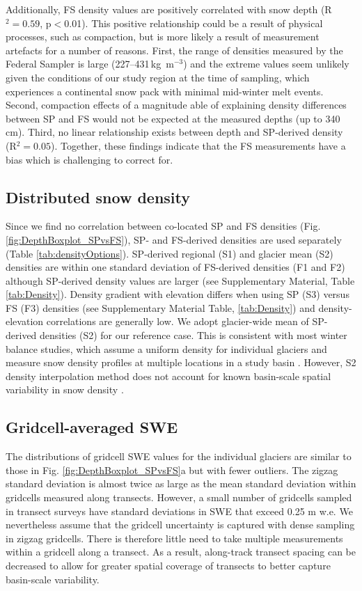 \documentclass[twocolumn, letterpaper]{igs}
\begin{document}
Additionally, FS density values are positively correlated with snow depth (R$^2= 0.59$, p$<$0.01). This positive relationship could be a result of physical processes, such as compaction, but is more likely a result of measurement artefacts for a number of reasons. First, the range of densities measured by the Federal Sampler is large (227--431\,kg\, m$^{-3}$) and the extreme values seem unlikely given the conditions of our study region at the time of sampling, which experiences a continental snow pack with minimal mid-winter melt events. Second, compaction effects of a magnitude able of explaining density differences between SP and FS would not be expected at the measured depths (up to 340\,cm). Third, no linear relationship exists between depth and SP-derived density (R$^2 = 0.05$). Together, these findings indicate that the FS measurements have a bias which is challenging to correct for.

\subsection{Distributed snow density}

Since we find no correlation between co-located SP and FS densities (Fig. \ref{fig:DepthBoxplot_SPvsFS}), SP- and FS-derived densities are used separately (Table \ref{tab:densityOptions}). SP-derived regional (S1) and glacier mean (S2) densities are within one standard deviation of FS-derived densities (F1 and F2) although SP-derived density values are larger (see Supplementary Material, Table \ref{tab:Density}). Density gradient with elevation differs when using SP (S3) versus FS (F3) densities (see Supplementary Material Table, \ref{tab:Density}) and density-elevation correlations are generally low. 
We adopt glacier-wide mean of SP-derived densities (S2) for our reference case. This is consistent with most winter balance studies, which assume a uniform density for individual glaciers and measure snow density profiles at multiple locations in a study basin \citep[e.g.][]{Elder1991,McGrath2015,Cullen2017}. However, S2 density interpolation method does not account for known basin-scale spatial variability in snow density \citep[e.g.][]{Wetlaufer2016}. 

\subsection{Gridcell-averaged SWE}

The distributions of gridcell SWE values for the individual glaciers are similar to those in Fig. \ref{fig:DepthBoxplot_SPvsFS}a but with fewer outliers. The zigzag standard deviation is almost twice as large as the mean standard deviation within gridcells measured along transects. However, a small number of gridcells sampled in transect surveys have standard deviations in SWE that exceed 0.25 m w.e. We nevertheless assume that the gridcell uncertainty is captured with dense sampling in zigzag gridcells. There is therefore little need to take multiple measurements within a gridcell along a transect. As a result, along-track transect spacing can be decreased to allow for greater spatial coverage of transects to better capture basin-scale variability.
\end{document}
